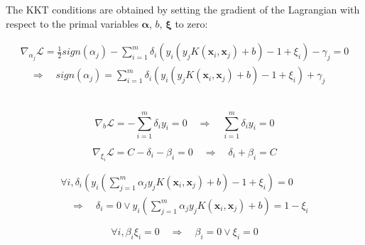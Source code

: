\documentclass{article}
\begin{document}
The KKT conditions are obtained by setting the gradient of the Lagrangian with respect to the primal variables $\bm{\alpha}$, $b$, $\bm{\xi}$ to zero:

\begin{equation}
    \begin{aligned}
        \nabla_{\alpha_{j}} \mathcal{L} = 
        \frac{1}{2} sign(\alpha_{j})
        - 
            \sum_{i=1}^{m} 
            \delta_{i}
            \left(
                y_{i}\left(  y_{j} K\left(\boldsymbol{x}_{i}, \boldsymbol{x}_{j}\right)+b\right) - 1 + \xi_{i}
            \right) 
        - \gamma_{j}
        = 0 \\
        \quad \Longrightarrow \quad 
        sign(\alpha_{j}) =
        \sum_{i=1}^{m} 
        \delta_{i}
        \left(
            y_{i}\left(  y_{j} K\left(\boldsymbol{x}_{i}, \boldsymbol{x}_{j}\right)+b\right) - 1 + \xi_{i}
        \right) 
        + \gamma_{j}
    \end{aligned}
    \label{eq:KKT}
\end{equation}\

\begin{equation}
    \nabla_{b} \mathcal{L}=
    -\sum_{i=1}^{m} \delta_{i} y_{i}=0 
    \quad \Longrightarrow \quad \sum_{i=1}^{m} \delta_{i} y_{i}=0
\end{equation}

\begin{equation}
    \nabla_{\xi_{i}} \mathcal{L}=C-\delta_{i}-\beta_{i}=0 \quad \Longrightarrow \quad \delta_{i}+\beta_{i}=C
\end{equation}

\begin{equation}
    \begin{aligned}
        \forall i, \delta_{i}
        \left(
            y_{i}\left(\sum_{j=1}^{m} \alpha_{j} y_{j} K\left(\boldsymbol{x}_{i}, \boldsymbol{x}_{j}\right)+b\right) - 1 + \xi_{i} 
        \right)
        = 0 \\
        \quad \Longrightarrow \quad 
        \delta_{i}=0 
        \vee 
        y_{i}\left(\sum_{j=1}^{m} \alpha_{j} y_{j} K\left(\boldsymbol{x}_{i}, \boldsymbol{x}_{j}\right)+b\right) = 1 - \xi_{i} 
    \end{aligned}
    \label{eq:constraint}
\end{equation}


\begin{equation}
    \forall i, \beta_{i} \xi_{i}=0 \quad \Longrightarrow \quad \beta_{i}=0 \vee \xi_{i}=0
\end{equation}
\end{document}

